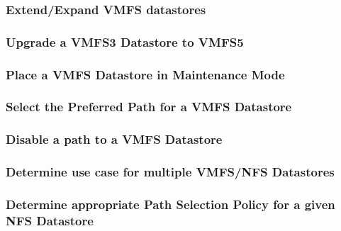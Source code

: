 \subsubsection{Extend/Expand VMFS datastores}

\subsubsection{Upgrade a VMFS3 Datastore to VMFS5}

\subsubsection{Place a VMFS Datastore in Maintenance Mode}

\subsubsection{Select the Preferred Path for a VMFS Datastore}

\subsubsection{Disable a path to a VMFS Datastore}

\subsubsection{Determine use case for multiple VMFS/NFS Datastores}

\subsubsection{Determine appropriate Path Selection Policy for a given NFS Datastore}
